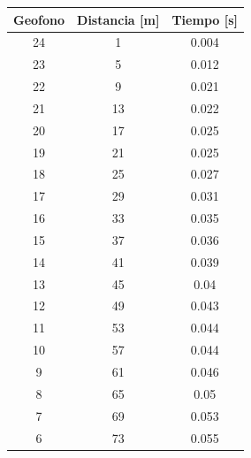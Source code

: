 \documentclass{article}
\theoremstyle{mytheoremstyle}
\theoremstyle{mytheoremstyle}
\theoremstyle{myproblemstyle}
\begin{document}
		\begin{table}[h!]
			\centering
			\begin{tabular}{|c|c|c|}
			\hline
			\textbf{Geofono} & \textbf{Distancia {[}m{]}} & \textbf{Tiempo {[}s{]}} \\ \hline
			24               & 1                          & 0.004                   \\ \hline
			23               & 5                          & 0.012                   \\ \hline
			22               & 9                          & 0.021                   \\ \hline
			21               & 13                         & 0.022                   \\ \hline
			20               & 17                         & 0.025                   \\ \hline
			19               & 21                         & 0.025                   \\ \hline
			18               & 25                         & 0.027                   \\ \hline
			17               & 29                         & 0.031                   \\ \hline
			16               & 33                         & 0.035                   \\ \hline
			15               & 37                         & 0.036                   \\ \hline
			14               & 41                         & 0.039                   \\ \hline
			13               & 45                         & 0.04                    \\ \hline
			12               & 49                         & 0.043                   \\ \hline
			11               & 53                         & 0.044                   \\ \hline
			10               & 57                         & 0.044                   \\ \hline
			9                & 61                         & 0.046                   \\ \hline
			8                & 65                         & 0.05                    \\ \hline
			7                & 69                         & 0.053                   \\ \hline
			6                & 73                         & 0.055                   \\ \hline

\end{tabular}
\end{table}
\end{document}
